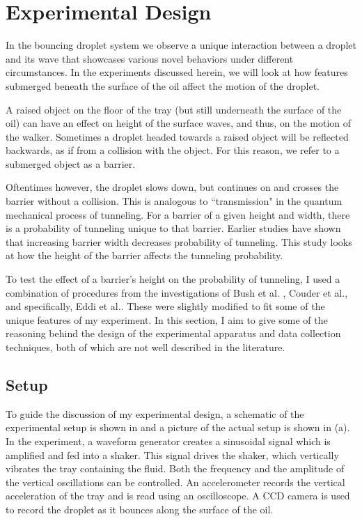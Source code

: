 \chapter{Experimental Design}
\label{Ch2}

In the bouncing droplet system we observe a unique interaction between a droplet and its wave that showcases various novel behaviors under different circumstances.  In the experiments discussed herein, we will look at how features submerged beneath the surface of the oil affect the motion of the droplet. 

A raised object on the floor of the tray (but still underneath the surface of the oil) can have an effect on height of the surface waves, and thus, on the motion of the walker. Sometimes a droplet headed towards a raised object will be reflected backwards, as if from a collision with the object. For this reason, we refer to a submerged object as a barrier. 

Oftentimes however, the droplet slows down, but continues on and crosses the barrier without a collision. This is analogous to ``transmission" in the quantum mechanical process of tunneling. For a barrier of a given height and width, there is a probability of tunneling unique to that barrier. Earlier studies have shown that increasing barrier width decreases probability of tunneling. This study looks at how the height of the barrier affects the tunneling probability. 

To test the effect of a barrier's height on the probability of tunneling, I used a combination of procedures from the investigations of Bush et al. , Couder et al., and specifically, Eddi et al.. These were slightly modified to fit some of the unique features of my experiment. In this section, I aim to give some of the reasoning behind the  design of the experimental apparatus and data collection techniques, both of which are not well described in the literature.

\section{Setup}
   To guide the discussion of my experimental design, a schematic of the experimental setup is shown in  and a picture of the actual setup is shown in (a). In the experiment, a waveform generator creates a sinusoidal signal which is amplified and fed into a shaker. This signal drives the shaker, which vertically vibrates the tray containing the fluid. Both the frequency and the amplitude of the vertical oscillations can be controlled. An accelerometer records the vertical acceleration of the tray and is read using an oscilloscope. A CCD camera is used to record the droplet as it bounces along the surface of the oil.  
    
